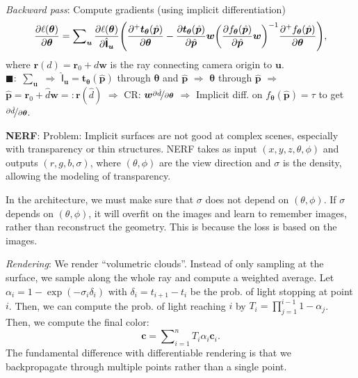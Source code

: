 \documentclass{article}
\newcommand{\lft}{\mathopen{}\mathclose\bgroup\left}
\newcommand{\rgt}{\aftergroup\egroup\right}
\renewcommand{\vec}[1]{\bm{#1}}
\newcommand{\tens}[1]{\bm{\mathsf{#1}}}
\newenvironment{topic}[1]
{\textbf{\sffamily \colorbox{black}{\rlap{\textbf{\textcolor{white}{#1}}}\hspace{\linewidth}\hspace{-2\fboxsep}}} \\ \vspace{0.2cm}}
{}
\begin{document}
\begin{multicols*}{2}
\begin{topic}{Implicit surfaces and neural radiance fields}
        \textit{Backward pass}: Compute gradients (using implicit differentiation) \[
            \pdv{\ell(\vec{\theta})}{\vec{\theta}} = \sum\nolimits_{\vec{u}} \pdv{\ell(\vec{\theta})}{\hat{\tens{I}}_{\vec{u}}} \lft( \pdv{^+ \vec{t}_{\vec{\theta}}(\hat{\vec{p}})}{\vec{\theta}} - \pdv{\vec{t}_{\vec{\theta}}(\hat{\vec{p}})}{\hat{\vec{p}}} \vec{w} \lft( \pdv{f_{\vec{\theta}}(\hat{\vec{p}})}{\hat{\vec{p}}} \vec{w} \rgt)^{-1} \pdv{^+ f_{\vec{\theta}}(\hat{\vec{p}})}{\vec{\theta}} \rgt),
        \]
        where $\vec{r}(d) = \vec{r}_0 + d \vec{w}$ is the ray connecting camera origin to $\vec{u}$.\\
        $\blacksquare:$ $\sum_{\vec{u}}$ $\Rightarrow$ $\hat{\tens{I}}_{\vec{u}} =
            \vec{t}_{\vec{\theta}}(\hat{\vec{p}})$ through $\vec{\theta}$ and $\hat{\vec{p}}$ $\Rightarrow$
        $\vec{\theta}$ through $\hat{\vec{p}}$ $\Rightarrow$ $\hat{\vec{p}} = \vec{r}_0 + \hat{d}\vec{w} =:
            \vec{r}(\hat{d})$ $\Rightarrow$ CR: $\vec{w} \nicefrac{\partial \hat{d}}{\partial \vec{\theta}}$
        $\Rightarrow$ Implicit diff. on $f_{\vec{\theta}}(\hat{\vec{p}}) = \tau$ to get $\nicefrac{\partial
                \hat{d}}{\partial \vec{\theta}}$.

        \textbf{NERF}: Problem: Implicit surfaces are not good at complex scenes, especially with
        transparency or thin structures. NERF takes as input $(x,y,z,\theta,\phi)$ and outputs
        $(r,g,b,\sigma)$, where $(\theta,\phi)$ are the view direction and $\sigma$ is the density,
        allowing the modeling of transparency.

        In the architecture, we must make sure that $\sigma$ does not depend on $(\theta,\phi)$. If
        $\sigma$ depends on $(\theta,\phi)$, it will overfit on the images and learn to remember images,
        rather than reconstruct the geometry. This is because the loss is based on the images.

        \textit{Rendering}: We render ``volumetric clouds''. Instead of only sampling at the surface, we sample
        along the whole ray and compute a weighted average. Let $\alpha_i = 1 - \exp(-\sigma_i \delta_i)$
        with $\delta_i = t_{i+1} - t_i$ be the prob. of light stopping at point $i$. Then, we can compute
        the prob. of light reaching $i$ by $T_i = \prod_{j=1}^{i-1} 1 - \alpha_j$. Then, we compute
        the final color: \[
            \vec{c} = \sum\nolimits_{i=1}^{n} T_i \alpha_i \vec{c}_i.
        \]
        The fundamental difference with differentiable rendering is that we backpropagate through multiple
        points rather than a single point.


\end{topic}
\end{multicols*}
\end{document}
